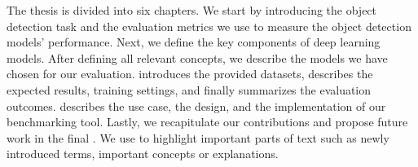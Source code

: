 The thesis is divided into six chapters. We start by introducing the object
detection task and the evaluation metrics we use to measure the object detection
models' performance. Next, we define the key components of deep learning models.
After defining all relevant concepts, we describe the models we have
chosen for our evaluation.  introduces the
provided datasets, describes the expected
results, training settings, and finally summarizes the evaluation outcomes.
 describes the use case, the design, and the
implementation of our benchmarking tool. Lastly, we recapitulate our
contributions and propose future work in the final
. We use  to highlight important
parts of text such as newly introduced terms, important concepts or explanations.